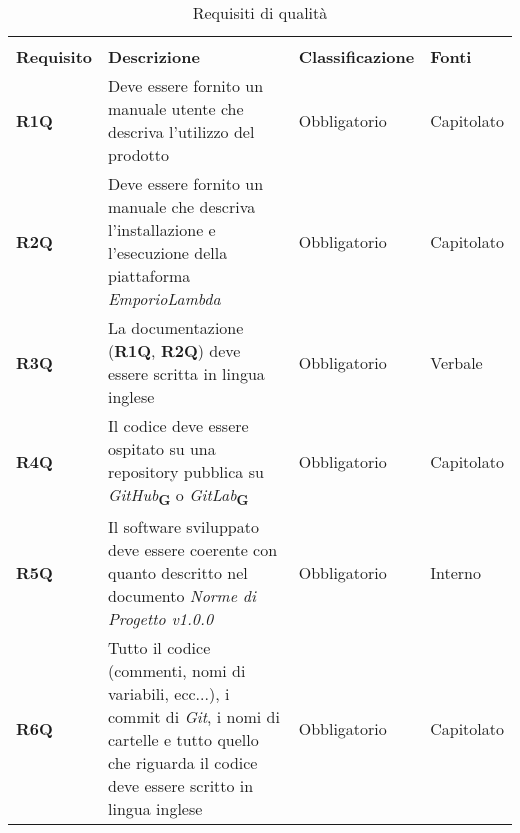 \begin{center}
    \centering
    \renewcommand{\arraystretch}{1.8}
    \label{tab:RequisitiQualita}
    \begin{longtable}[!h]{p{50px} p{200px} p{100px} p{50px}}
        \rowcolor{white}\caption{Requisiti di qualità}                                                                                                                                                                                                                                    \\
        \rowcolor{logo!70} \textbf{Requisito} & \textbf{Descrizione}                                                                                                                                                            & \textbf{Classificazione} & \textbf{Fonti}               \\
        \textbf{R1Q}                          & Deve essere fornito un manuale utente che descriva l'utilizzo del prodotto                                                                                                      & Obbligatorio             & Capitolato                   \\
        \textbf{R2Q}                          & Deve essere fornito un manuale che descriva l'installazione e l'esecuzione della piattaforma \textit{EmporioLambda}                                                             & Obbligatorio             & Capitolato                   \\
        \textbf{R3Q}                          & La documentazione (\textbf{R1Q}, \textbf{R2Q}) deve essere scritta in lingua inglese                                                                                            & Obbligatorio             & Verbale                      \\
        \textbf{R4Q}                          & Il codice deve essere ospitato su una repository pubblica su \textit{GitHub}\textsubscript{\textbf{G}} o \textit{GitLab}\textsubscript{\textbf{G}}                              & Obbligatorio             & Capitolato                   \\
        \textbf{R5Q}                          & Il software sviluppato deve essere coerente con quanto descritto nel documento \textit{Norme di Progetto v1.0.0}                                                                & Obbligatorio             & Interno                      \\
        \textbf{R6Q}                          & Tutto il codice (commenti, nomi di variabili, ecc...), i commit di \textit{Git}, i nomi di cartelle e tutto quello che riguarda il codice deve essere scritto in lingua inglese & Obbligatorio             & Capitolato                   \\

\end{longtable}
\end{center}
